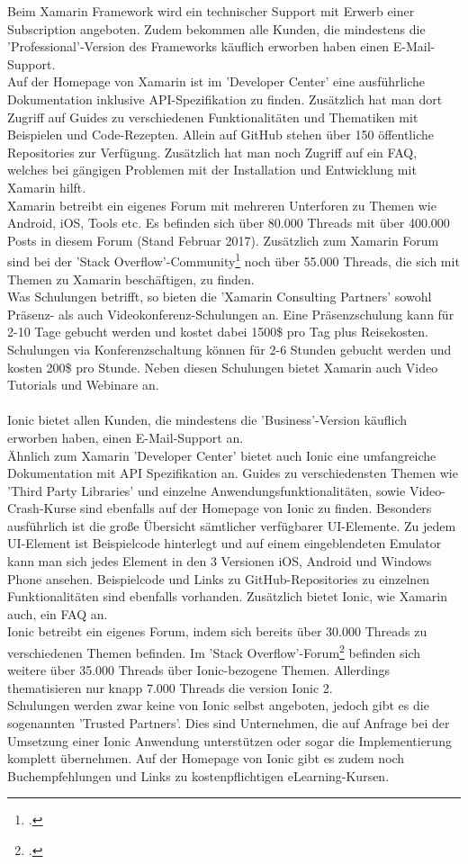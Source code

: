 Beim Xamarin Framework wird ein technischer Support mit Erwerb einer Subscription angeboten. Zudem bekommen alle Kunden, die mindestens die 'Professional'-Version des Frameworks käuflich erworben haben einen E-Mail-Support. 
\\
Auf der Homepage von Xamarin ist im 'Developer Center' eine ausführliche Dokumentation inklusive API-Spezifikation zu finden. Zusätzlich hat man dort Zugriff auf Guides zu verschiedenen Funktionalitäten und Thematiken mit Beispielen und Code-Rezepten. Allein auf GitHub stehen über 150 öffentliche Repositories zur Verfügung. Zusätzlich hat man noch Zugriff auf ein FAQ, welches bei gängigen Problemen mit der Installation und Entwicklung mit Xamarin hilft. 
\\
Xamarin betreibt ein eigenes Forum mit mehreren Unterforen zu Themen wie Android, iOS, Tools etc. Es befinden sich über 80.000 Threads mit über 400.000 Posts in diesem Forum (Stand Februar 2017). Zusätzlich zum Xamarin Forum sind bei der 'Stack Overflow'-Community\footcite{StackOverfolw} noch über 55.000 Threads, die sich mit Themen zu Xamarin beschäftigen, zu finden. 
\\
Was Schulungen betrifft, so bieten die 'Xamarin Consulting Partners' sowohl Präsenz- als auch Videokonferenz-Schulungen an. Eine Präsenzschulung kann für 2-10 Tage gebucht werden und kostet dabei 1500\$ pro Tag plus Reisekosten. Schulungen via Konferenzschaltung können für 2-6 Stunden gebucht werden und kosten 200\$ pro Stunde. Neben diesen Schulungen bietet Xamarin auch Video Tutorials und Webinare an. 
\\
\\
Ionic bietet allen Kunden, die mindestens die 'Business'-Version käuflich erworben haben, einen E-Mail-Support an. 
\\
Ähnlich zum Xamarin 'Developer Center' bietet auch Ionic eine umfangreiche Dokumentation mit API Spezifikation an. Guides zu verschiedensten Themen wie 'Third Party Libraries' und einzelne Anwendungsfunktionalitäten, sowie Video-Crash-Kurse sind ebenfalls auf der Homepage von Ionic zu finden. Besonders ausführlich ist die große Übersicht sämtlicher verfügbarer UI-Elemente. Zu jedem UI-Element ist Beispielcode hinterlegt und auf einem eingeblendeten Emulator kann man sich jedes Element in den 3 Versionen iOS, Android und Windows Phone ansehen. Beispielcode und Links zu GitHub-Repositories zu einzelnen Funktionalitäten sind ebenfalls vorhanden. Zusätzlich bietet Ionic, wie Xamarin auch, ein FAQ an. 
\\
Ionic betreibt ein eigenes Forum, indem sich bereits über 30.000 Threads zu verschiedenen Themen befinden. Im 'Stack Overflow'-Forum\footcite{StackOverfolw} befinden sich weitere über 35.000 Threads über Ionic-bezogene Themen. Allerdings thematisieren nur knapp 7.000 Threads die version Ionic 2. 
\\
Schulungen werden zwar keine von Ionic selbst angeboten, jedoch gibt es die sogenannten 'Trusted Partners'. Dies sind Unternehmen, die auf Anfrage bei der Umsetzung einer Ionic Anwendung unterstützen oder sogar die Implementierung komplett übernehmen. Auf der Homepage von Ionic gibt es zudem noch Buchempfehlungen und Links zu kostenpflichtigen eLearning-Kursen.

